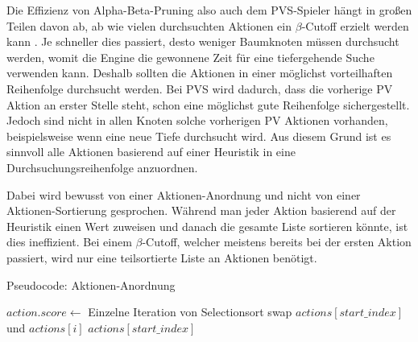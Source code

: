 Die Effizienz von Alpha-Beta-Pruning also auch dem \ac{PVS}-Spieler hängt in großen Teilen davon ab, ab wie vielen durchsuchten Aktionen ein $\beta$-Cutoff erzielt werden kann \cite{2003.AlphaBetaSearch}. Je schneller dies passiert, desto weniger Baumknoten müssen durchsucht werden, womit die Engine die gewonnene Zeit für eine tiefergehende Suche verwenden kann. Deshalb sollten die Aktionen in einer möglichst vorteilhaften Reihenfolge durchsucht werden. Bei \ac{PVS} wird dadurch, dass die vorherige \ac{PV} Aktion an erster Stelle steht, schon eine möglichst gute Reihenfolge sichergestellt. Jedoch sind nicht in allen Knoten solche vorherigen \ac{PV} Aktionen vorhanden, beispielsweise wenn eine neue Tiefe durchsucht wird. Aus diesem Grund ist es sinnvoll alle Aktionen basierend auf einer Heuristik in eine Durchsuchungsreihenfolge anzuordnen.

Dabei wird bewusst von einer Aktionen-Anordnung und nicht von einer Aktionen-Sortierung gesprochen. Während man jeder Aktion basierend auf der Heuristik einen Wert zuweisen und danach die gesamte Liste sortieren könnte, ist dies ineffizient. Bei einem $\beta$-Cutoff, welcher meistens bereits bei der ersten Aktion passiert, wird nur eine teilsortierte Liste an Aktionen benötigt. \cite{2022.MoveOrdering}


\begin{algorithm}[!ht]
    \caption{Pseudocode: Aktionen-Anordnung}
    \label{algo:action-ordering}
    \begin{algorithmic}[1]
        \State $action.score \gets $ 
        \EndFor
        \EndFunction
        \LineComment Einzelne Iteration von Selectionsort
        \State swap $actions\left[start\_index\right]$ und $actions\left[i\right]$
        \EndIf
        \State \Return $actions\left[start\_index\right]$
        \EndFor
        \EndFunction
    \end{algorithmic}
\end{algorithm}

